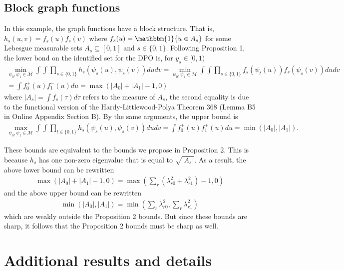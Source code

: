 \documentclass[12pt]{article}
\theoremstyle{definition}
\begin{document}
\subsection{Block graph functions} 
In this example, the graph functions have a block structure. That is, $h_{s}(u,v) = f_{s}(u)f_{s}(v)$ where $f_{s}(u) = \mathbbm{1}\{u \in A_{s}\}$ for some Lebesgue measurable sets $A_{s} \subseteq [0,1]$ and $s \in \{0,1\}$. Following Proposition 1, the lower bond on the identified set for the DPO is, for $y_{s} \in [0,1)$
\begin{align*}
\min_{\psi_{0},\psi_{1} \in \mathcal{M}}\int\int \prod_{s \in \{0,1\}}h_s(\psi_s(u),\psi_s(v))dudv  
= \min_{\psi_{0},\psi_{1} \in \mathcal{M}}\int\int \prod_{s \in \{0,1\}}f_{s}(\psi_{t}(u))f_{s}(\psi_{s}(v))dudv \\
= \int f_{0}^{+}(u)f_{1}^{-}(u)du
= \max(|A_{0}|+|A_{1}| - 1, 0)
\end{align*}
where $|A_{s}| = \int f_{s}(\tau)d\tau$ refers to the measure of $A_{s}$, the second equality is due to the functional version of the Hardy-Littlewood-Polya Theorem 368 (Lemma B5 in Online Appendix Section B). By the same arguments, the upper bound is 
\begin{align*}
\max_{\psi_{0},\psi_{1} \in \mathcal{M}}\int\int \prod_{t \in \{0,1\}}h_s(\psi_s(u),\psi_s(v))dudv
= \int f_{0}^{+}(u)f_{1}^{+}(u)du
= \min(|A_{0}|,|A_{1}|).
\end{align*}

These bounds are equivalent to the bounds we propose in Proposition 2. This is because $h_s$ has  one non-zero eigenvalue that is equal to $\sqrt{|A_{s}|}$. As a result, the above lower bound can be rewritten 
\begin{align*}
\max(|A_{0}|+|A_{1}| - 1, 0) = \max\left(\sum_{r}(\lambda_{r0}^{2} + \lambda_{r1}^{2}) - 1, 0\right) 
\end{align*}
and the above upper bound can be rewritten
\begin{align*}
\min(|A_{0}|,|A_{1}|) = \min\left(\sum_{r}\lambda_{r0}^{2} , \sum_r\lambda_{r1}^{2}\right) 
\end{align*}
which are weakly outside the Proposition 2 bounds. But since these bounds are sharp, it follows that the Proposition 2 bounds must be sharp as well. 

\section{Additional results and details}
\end{document}
